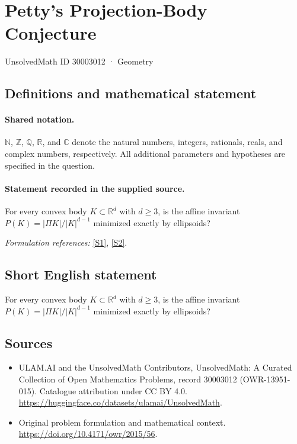 \documentclass[11pt]{article}
\newcommand{\sref}[2]{\hyperlink{source:#1:#2}{[S#2]}}
\begin{document}
\setcounter{section}{30003011}
\section{Petty’s Projection-Body Conjecture}\label{30003012}
{\small UnsolvedMath ID 30003012 · Geometry}
\subsection{Definitions and mathematical statement}

\paragraph{Shared notation.}$\mathbb N$, $\mathbb Z$, $\mathbb Q$, $\mathbb R$, and $\mathbb C$ denote the natural numbers, integers, rationals, reals, and complex numbers, respectively. All additional parameters and hypotheses are specified in the question.


\paragraph{Statement recorded in the supplied source.}
For every convex body $K\subset\mathbb{R}^d$ with $d\geq3$, is the affine invariant $P(K)=|\Pi K|/|K|^{d-1}$ minimized exactly by ellipsoids?
\par\smallskip\textit{Formulation references:} \sref{30003012}{1}, \sref{30003012}{2}.
\subsection{Short English statement}
For every convex body $K\subset\mathbb{R}^d$ with $d\geq3$, is the affine invariant $P(K)=|\Pi K|/|K|^{d-1}$ minimized exactly by ellipsoids?
\subsection{Sources}
\begin{itemize}
\item[\hypertarget{source:30003012:1}{S1}] ULAM.AI and the UnsolvedMath Contributors, UnsolvedMath: A Curated Collection of Open Mathematics Problems, record 30003012 (OWR-13951-015). Catalogue attribution under CC BY 4.0.
\url{https://huggingface.co/datasets/ulamai/UnsolvedMath}.
\item[\hypertarget{source:30003012:2}{S2}] Original problem formulation and mathematical context.
\url{https://doi.org/10.4171/owr/2015/56}.
\end{itemize}
\label{end:30003012}
\end{document}
